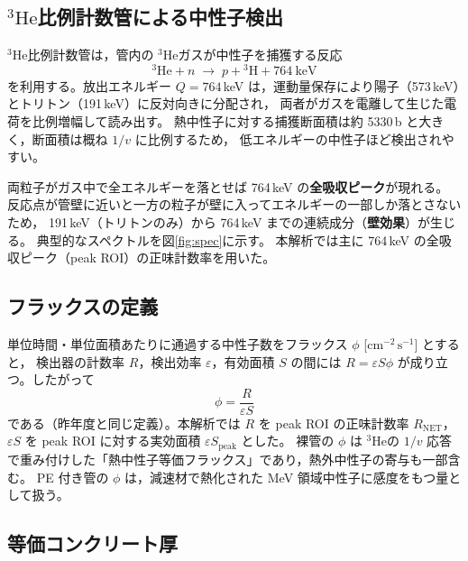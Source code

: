 \documentclass[a4paper,11pt]{ltjsarticle}
\newcommand{\He}{\ensuremath{{}^{3}\mathrm{He}}}
\newcommand{\RNET}{R_{\mathrm{NET}}}
\newcommand{\eSpk}{\varepsilon S_{\mathrm{peak}}}
\newcommand{\flux}{\mathrm{cm^{-2}\,s^{-1}}}
\begin{document}
\subsection{\He 比例計数管による中性子検出}

\He 比例計数管は，管内の \He ガスが中性子を捕獲する反応
\begin{equation}
  {}^{3}\mathrm{He} + n \;\to\; p + {}^{3}\mathrm{H} + 764\ \mathrm{keV}
\end{equation}
を利用する。放出エネルギー $Q=764$\,keV は，運動量保存により陽子（573\,keV）とトリトン（191\,keV）に反対向きに分配され，
両者がガスを電離して生じた電荷を比例増幅して読み出す。
熱中性子に対する捕獲断面積は約 5330\,b と大きく，断面積は概ね $1/v$ に比例するため，
低エネルギーの中性子ほど検出されやすい\cite{Knoll}。

両粒子がガス中で全エネルギーを落とせば 764\,keV の\textbf{全吸収ピーク}が現れる。
反応点が管壁に近いと一方の粒子が壁に入ってエネルギーの一部しか落とさないため，
191\,keV（トリトンのみ）から 764\,keV までの連続成分（\textbf{壁効果}）が生じる。
典型的なスペクトルを図\ref{fig:spec}に示す。
本解析では主に 764\,keV の全吸収ピーク（peak ROI）の正味計数率を用いた。

\subsection{フラックスの定義}

単位時間・単位面積あたりに通過する中性子数をフラックス $\phi$ [$\flux$] とすると，
検出器の計数率 $R$，検出効率 $\varepsilon$，有効面積 $S$ の間には $R=\varepsilon S\phi$ が成り立つ。したがって
\begin{equation}
  \phi = \frac{R}{\varepsilon S}
  \label{eq:flux}
\end{equation}
である（昨年度と同じ定義）。本解析では $R$ を peak ROI の正味計数率 $\RNET$，$\varepsilon S$ を peak ROI に対する実効面積 $\eSpk$ とした。
裸管の $\phi$ は \He の $1/v$ 応答で重み付けした「熱中性子等価フラックス」であり，熱外中性子の寄与も一部含む。
PE 付き管の $\phi$ は，減速材で熱化された MeV 領域中性子に感度をもつ量として扱う。

\subsection{等価コンクリート厚}
\end{document}
